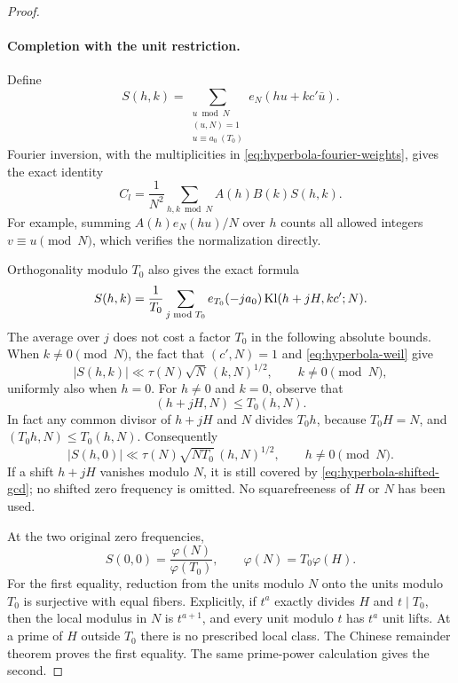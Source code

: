 \begin{proof}
\paragraph{Completion with the unit restriction.}
Define
\[
 S(h,k)=
 \sum_{\substack{u\bmod N\\(u,N)=1\\u\equiv a_0\ (T_0)}}
       e_N(hu+kc'\bar u).
\]
Fourier inversion, with the multiplicities in
\eqref{eq:hyperbola-fourier-weights}, gives the exact identity
\begin{equation}
\label{eq:hyperbola-completion-identity}
 C_l=\frac1{N^2}\sum_{h,k\bmod N}A(h)B(k)S(h,k).
\end{equation}
For example, summing $A(h)e_N(hu)/N$ over $h$ counts all allowed
integers $v\equiv u\pmod N$, which verifies the normalization directly.

Orthogonality modulo $T_0$ also gives the exact formula
\begin{equation}
\label{eq:hyperbola-restricted-sum}
 S(h,k)=\frac1{T_0}\sum_{j\bmod T_0}
       e_{T_0}(-ja_0)\operatorname{Kl}(h+jH,kc';N).
\end{equation}
The average over $j$ does not cost a factor $T_0$ in the following
absolute bounds.  When $k\ne0\pmod N$, the fact that $(c',N)=1$
and \eqref{eq:hyperbola-weil} give
\begin{equation}
\label{eq:hyperbola-second-nonzero}
 |S(h,k)|\ll\tau(N)\sqrt N\,(k,N)^{1/2},
 \qquad k\ne0\pmod N,
\end{equation}
uniformly also when $h=0$.  For $h\ne0$ and $k=0$, observe that
\begin{equation}
\label{eq:hyperbola-shifted-gcd}
 (h+jH,N)\le T_0(h,N).
\end{equation}
In fact any common divisor of $h+jH$ and $N$ divides $T_0h$, because
$T_0H=N$, and $(T_0h,N)\le T_0(h,N)$.  Consequently
\begin{equation}
\label{eq:hyperbola-first-nonzero}
 |S(h,0)|\ll\tau(N)\sqrt{NT_0}\,(h,N)^{1/2},
 \qquad h\ne0\pmod N.
\end{equation}
If a shift $h+jH$ vanishes modulo $N$, it is still covered by
\eqref{eq:hyperbola-shifted-gcd}; no shifted zero frequency is omitted.
No squarefreeness of $H$ or $N$ has been used.

At the two original zero frequencies,
\begin{equation}
\label{eq:hyperbola-complete-zero}
 S(0,0)=\frac{\varphi(N)}{\varphi(T_0)},\qquad
 \varphi(N)=T_0\varphi(H).
\end{equation}
For the first equality, reduction from the units modulo $N$ onto
the units modulo $T_0$ is surjective with equal fibers.  Explicitly,
if $t^a$ exactly divides $H$ and $t\mid T_0$, then the local modulus
in $N$ is $t^{a+1}$, and every unit modulo $t$ has $t^a$ unit lifts.
At a prime of $H$ outside $T_0$ there is no prescribed local class.
The Chinese remainder theorem proves the first equality.  The same
prime-power calculation gives the second.


\end{proof}
